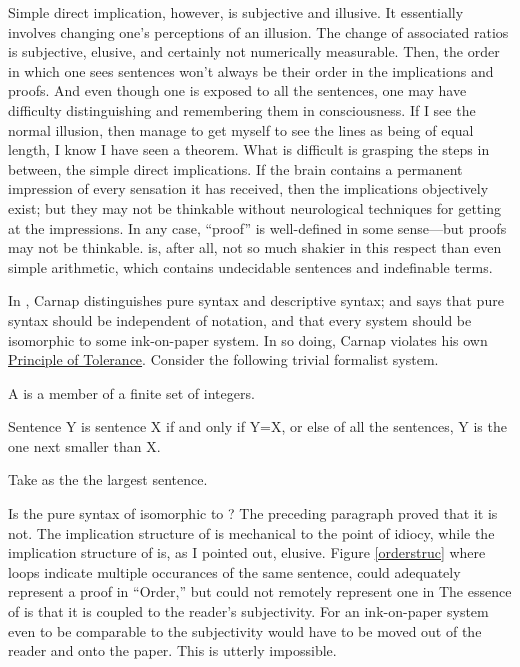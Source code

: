 Simple direct implication, however, is subjective and illusive. It 
essentially involves changing one's perceptions of an illusion. The change of 
associated ratios is subjective, elusive, and certainly not numerically 
measurable. Then, the order in which one sees sentences won't always be 
their order in the implications and proofs. And even though one is exposed 
to all the sentences, one may have difficulty distinguishing and remembering 
them in consciousness. If I see the normal illusion, then manage to get 
myself to see the lines as being of equal length, I know I have seen a 
theorem. What is difficult is grasping the steps in between, the simple direct 
implications. If the brain contains a permanent impression of every sensation 
it has received, then the implications objectively exist; but they may not be 
thinkable without neurological techniques for getting at the impressions. In 
any case, \enquote{proof} is well-defined in some sense---but proofs may not be 
thinkable.  is, after all, not so much shakier in this respect than 
even simple arithmetic, which contains undecidable sentences and 
indefinable terms. 

In , Carnap distinguishes pure syntax 
and descriptive syntax; and says that pure syntax should be independent of 
notation, and that every system should be isomorphic to some ink-on-paper 
system. In so doing, Carnap violates his own \uline{Principle of Tolerance}. Consider 
the following trivial formalist system. 


\begin{sysrules}
A  is a member of a finite set of integers. 

Sentence Y is  sentence X if and only if Y=X, or else of all the 
sentences, Y is the one next smaller than X. 

Take as the  the largest sentence. 
\end{sysrules}

Is the pure syntax of  isomorphic to ? The preceding 
paragraph proved that it is not. The implication structure of  is 
mechanical to the point of idiocy, while the implication structure of 
 is, as I pointed out, elusive. Figure \ref{orderstruc}
where loops indicate multiple occurances of the same sentence, could 
adequately represent a proof in \enquote{Order,} but could not remotely represent 
one in  The essence of  is that it is coupled to the 
reader's subjectivity. For an ink-on-paper system even to be comparable to 
 the subjectivity would have to be moved out of the reader and 
onto the paper. This is utterly impossible. 

